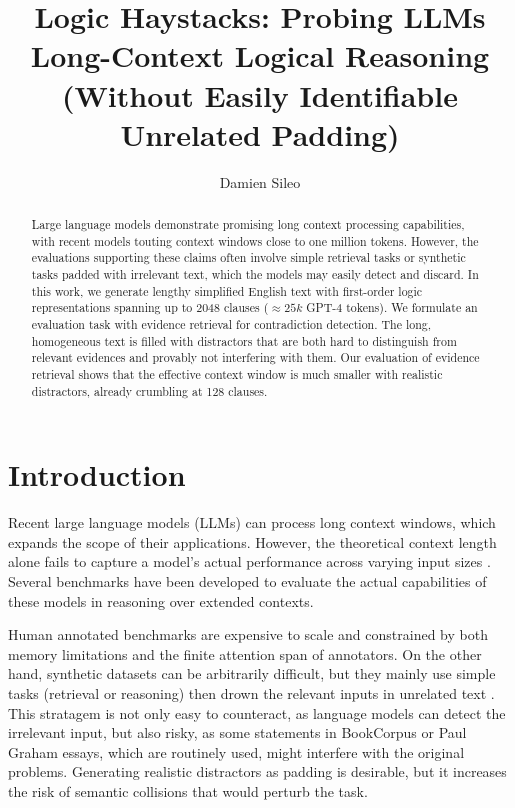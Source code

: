 \documentclass[11pt]{article}
\title{
Logic Haystacks: Probing LLMs Long-Context Logical Reasoning\\
(Without Easily Identifiable Unrelated Padding)
}
\author[]{Damien Sileo}
\affil[]{Univ. Lille, Inria, CNRS, Centrale Lille, UMR 9189 - CRIStAL, F-59000 Lille, France}
\affil[]{\url{damien.sileo@inria.fr}}
\begin{document}
\maketitle
\begin{abstract}
Large language models demonstrate promising long context processing capabilities, with recent models touting context windows close to one million tokens. However, the evaluations supporting these claims often involve simple retrieval tasks or synthetic tasks padded with irrelevant text, which the models may easily detect and discard.
In this work, we generate lengthy simplified English text with first-order logic representations spanning up to 2048 clauses ($\approx25k$ GPT-4 tokens). We formulate an evaluation task with evidence retrieval for contradiction detection.  The long, homogeneous text is filled with distractors that are both hard to distinguish from relevant evidences and provably not interfering with them. Our evaluation of evidence retrieval shows that the effective context window is much smaller with realistic distractors, already crumbling at 128 clauses.


\end{abstract}

\section{Introduction}

Recent large language models (LLMs) can process long context windows, which expands the scope of their applications. However, the theoretical context length alone fails to capture a model's actual performance across varying input sizes \cite{liu2024lost}. Several benchmarks have been developed to evaluate the actual capabilities of these models in reasoning over extended contexts. 

Human annotated benchmarks   \cite{bowman2022quality,wang2024novelqa,bai2024longbench} are expensive to scale and constrained by both memory limitations and the finite attention span of annotators. On the other hand, synthetic datasets can be arbitrarily difficult, but they mainly use simple tasks (retrieval or reasoning) then drown the relevant inputs in unrelated text \cite{kamradt2023needlenih,levy2024same,li2024needlebench}. This stratagem is not only easy to counteract, as language models can detect the irrelevant input, but also risky, as some statements in BookCorpus or Paul Graham essays, which are routinely used, might interfere with the original problems.
Generating realistic distractors as padding is desirable, but it increases the risk of semantic collisions that would perturb the task.
\end{document}
